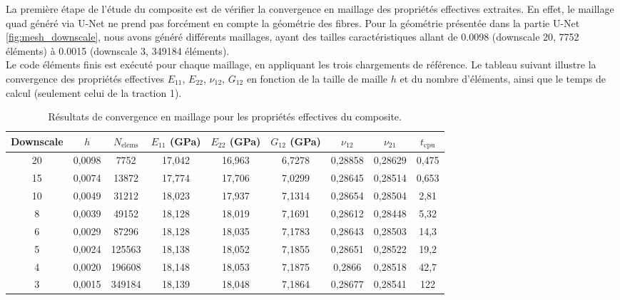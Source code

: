 \documentclass[a4paper,11pt]{article}
\begin{document}
La première étape de l'étude du composite est de vérifier la convergence en maillage des propriétés effectives extraites. En effet, le maillage quad généré via U-Net ne prend pas forcément en compte la géométrie des fibres. Pour la géométrie présentée dans la partie U-Net \ref{fig:mesh_downscale}, nous avons généré différents maillages, ayant des tailles caractéristiques allant de 0.0098 (downscale 20, 7752 éléments) à 0.0015 (downscale 3, 349184 éléments). \\

Le code éléments finis est exécuté pour chaque maillage, en appliquant les trois chargements de référence. Le tableau suivant illustre la convergence des propriétés effectives $E_{11}$, $E_{22}$, $\nu_{12}$, $G_{12}$ en fonction de la taille de maille $h$ et du nombre d'éléments, ainsi que le temps de calcul (seulement celui de la traction 1).

\begin{table}[H]
    \centering
    \footnotesize
    \setlength{\tabcolsep}{3pt}
    \begin{tabular}{|c|c|c|c|c|c|c|c|c|}
        \hline
        Downscale & $h$ & $N_{\text{elems}}$ & $E_{11}$ (GPa) & $E_{22}$ (GPa) & $G_{12}$ (GPa) & $\nu_{12}$ & $\nu_{21}$ & $t_{\text{cpu}}$ \\
        \hline
        20 & 0,0098 & 7752   & 17,042 & 16,963 & 6,7278 & 0,28858 & 0,28629 & 0,475 \\
        15 & 0,0074 & 13872  & 17,774 & 17,706 & 7,0299 & 0,28645 & 0,28514 & 0,653 \\
        10 & 0,0049 & 31212  & 18,023 & 17,937 & 7,1314 & 0,28654 & 0,28504 & 2,81 \\
        8  & 0,0039 & 49152  & 18,128 & 18,019 & 7,1691 & 0,28612 & 0,28448 & 5,32 \\
        6  & 0,0029 & 87296  & 18,128 & 18,035 & 7,1783 & 0,28643 & 0,28503 & 14,3 \\
        5  & 0,0024 & 125563 & 18,138 & 18,052 & 7,1855 & 0,28651 & 0,28522 & 19,2 \\
        4  & 0,0020 & 196608 & 18,148 & 18,053 & 7,1875 & 0,2866 & 0,28518 & 42,7 \\
        3  & 0,0015 & 349184 & 18,139 & 18,048 & 7,1864 & 0,28677 & 0,28541 & 122 \\
        \hline
    \end{tabular}
    \caption{Résultats de convergence en maillage pour les propriétés effectives du composite.}
    \label{tab:convergence_maillage_composite}
\end{table}
\end{document}
